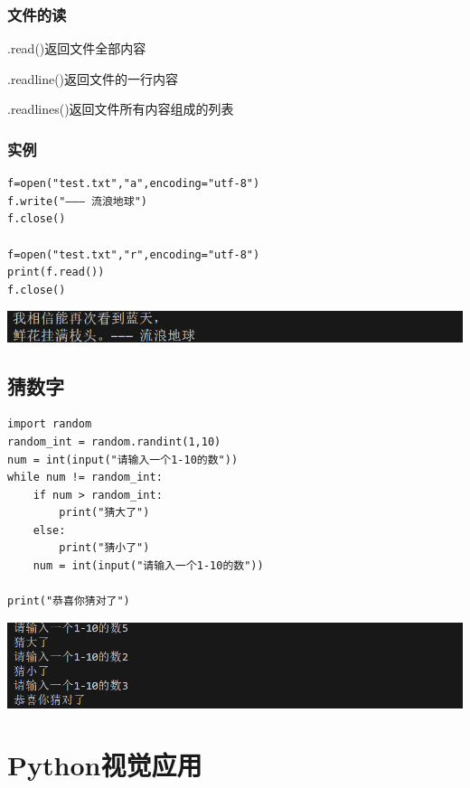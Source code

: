 \documentclass[UTF8,a4paper]{ctexart}
\begin{document}
\subsubsection{文件的读}
.read()返回文件全部内容\par
.readline()返回文件的一行内容\par
.readlines()返回文件所有内容组成的列表\par
\subsubsection{实例}
\begin{lstlisting}
f=open("test.txt","a",encoding="utf-8")
f.write("——— 流浪地球")
f.close()

f=open("test.txt","r",encoding="utf-8")
print(f.read())
f.close()

\end{lstlisting}
\includegraphics[width=1\textwidth]{./python/file1.png}

\subsection{猜数字}
\begin{lstlisting}
import random
random_int = random.randint(1,10)
num = int(input("请输入一个1-10的数"))
while num != random_int:
    if num > random_int:
        print("猜大了")
    else:
        print("猜小了")
    num = int(input("请输入一个1-10的数"))

print("恭喜你猜对了")
\end{lstlisting}
\includegraphics[width=1\textwidth]{./python/game.png}

\section{Python视觉应用}
\end{document}

